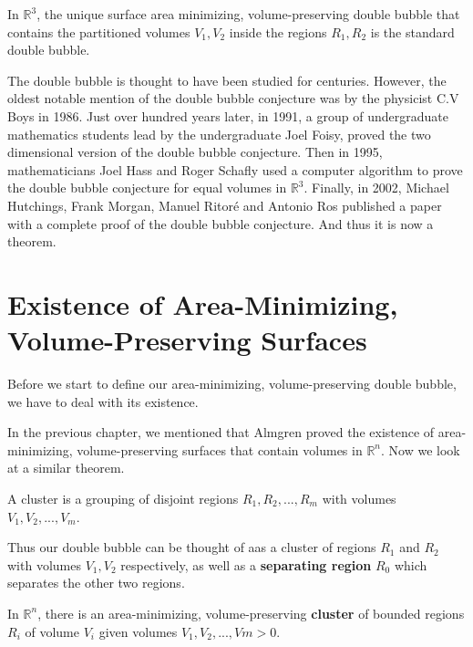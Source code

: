 \documentclass[a4paper,12pt]{report}
\begin{document}
\begin{theorem}
In $\mathbb{R}^{3}$, the unique surface area minimizing, volume-preserving double bubble that contains the partitioned volumes $V_{1},V_{2}$ inside the regions $R_{1},R_{2}$ is the standard double bubble.
\end{theorem}

The double bubble is thought to have been studied for centuries. However, the oldest notable mention of the double bubble conjecture was by the physicist C.V Boys in 1986. Just over hundred years later, in 1991, a group of undergraduate mathematics students lead by the undergraduate Joel Foisy, proved the two dimensional version of the double bubble conjecture. Then in 1995, mathematicians Joel Hass and Roger Schafly used a computer algorithm to prove the double bubble conjecture for equal volumes in $\mathbb{R}^{3}$. Finally, in 2002, Michael Hutchings, Frank Morgan, Manuel Ritor\'e and Antonio Ros published a paper with a complete proof of the double bubble conjecture. And thus it is now a theorem.

\section{Existence of Area-Minimizing, Volume-Preserving Surfaces}

Before we start to define our area-minimizing, volume-preserving double bubble, we have to deal with its existence.

\hspace{-0.66cm}In the previous chapter, we mentioned that Almgren proved the existence of area-minimizing, volume-preserving surfaces that contain volumes in $\mathbb{R}^{n}$. Now we look at a similar theorem.

\begin{definition}
A cluster is a grouping of disjoint regions $R_{1}, R_{2}, ... , R_{m}$ with volumes $V_{1}, V_{2}, ... , V_{m}$.
\end{definition}

Thus our double bubble can be thought of aas a cluster of regions $R_{1}$ and $R_{2}$ with volumes $V_{1}, V_{2}$ respectively, as well as a \textbf{separating region} $R_{0}$ which separates the other two regions.

\begin{theorem}
In $\mathbb{R}^{n}$, there is an area-minimizing, volume-preserving \textbf{cluster} of bounded regions $R_{i}$ of volume $V_{i}$ given volumes $V_{1}, V_{2}, ... , Vm > 0$.
\end{theorem}
\end{document}
